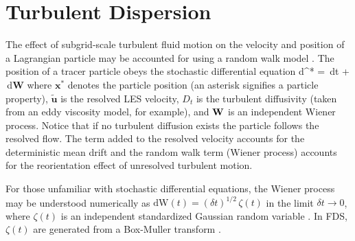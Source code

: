 \section{Turbulent Dispersion}

The effect of subgrid-scale turbulent fluid motion on the velocity and position of a Lagrangian particle may be accounted for using a random walk model \cite{Raman:CF}.  The position of a tracer particle obeys the stochastic differential equation
\be
\mbox{d}^* =  \,\mbox{d}t +  \,\mbox{d}\mbox{\textbf{W}}
\ee
where $\mathbf{x}^*$ denotes the particle position (an asterisk signifies a particle property), $\tilde{\mathbf{u}}$ is the resolved LES velocity, $D_t$ is the turbulent diffusivity (taken from an eddy viscosity model, for example), and $\mbox{\textbf{W}}$ is an independent Wiener process.  Notice that if no turbulent diffusion exists the particle follows the resolved flow.  The term added to the resolved velocity accounts for the deterministic mean drift and the random walk term (Wiener process) accounts for the reorientation effect of unresolved turbulent motion.

For those unfamiliar with stochastic differential equations, the Wiener process may be understood numerically as $\mbox{dW}(t) = (\delta t)^{1/2} \, \zeta(t)$ in the limit $\delta t \rightarrow 0$, where $\zeta(t)$ is an independent standardized Gaussian random variable \cite{Pope:2000}.  In FDS, $\zeta(t)$ are generated from a Box-Muller transform \cite{Box-Muller:1958}.






















